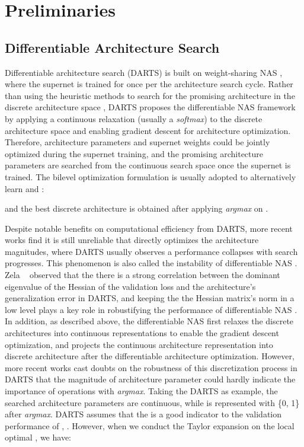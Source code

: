 \documentclass[10pt,twocolumn,letterpaper]{article}
\begin{document}
\section{Preliminaries}
\label{sec2}
\subsection{Differentiable Architecture Search}
\label{sec2.1}

Differentiable architecture search (DARTS) is built on weight-sharing NAS \cite{bender2018understanding,pham2018efficient}, where the supernet is trained for once per the architecture search cycle. Rather than using the heuristic methods \cite{pham2018efficient,zhang2020one} to search for the promising architecture in the discrete architecture space , DARTS \cite{liu2018darts} proposes the differentiable NAS framework by applying a continuous relaxation (usually a \textit{softmax}) to the discrete architecture space and enabling gradient descent for architecture optimization. Therefore, architecture parameters  and supernet weights  could be jointly optimized during the supernet training, and the promising architecture parameters  are searched from the continuous search space  once the supernet is trained. The bilevel optimization formulation is usually adopted to alternatively learn  and :

and the best discrete architecture  is obtained after applying \textit{argmax} on . 

Despite notable benefits on computational efficiency from DARTS, more recent works find it is still unreliable \cite{zela2019understanding,chen2020stabilizing} that directly optimizes the architecture magnitudes, where DARTS usually observes a performance collapses with search progresses. This phenomenon is also called the instability of differentiable NAS  \cite{chen2020stabilizing}. Zela \etal~\cite{zela2019understanding} observed that the there is a strong correlation between the dominant eigenvalue of the Hessian of the validation loss and the architecture’s generalization error in DARTS, and keeping the the Hessian matrix's norm in a low level plays a key role in robustifying the performance of differentiable NAS \cite{chen2020stabilizing}. In addition, as described above, the differentiable NAS first relaxes the discrete architectures into continuous representations to enable the gradient descent optimization, and projects the continuous architecture representation  into discrete architecture  after the differentiable architecture optimization. However, more recent works \cite{Rethinking2021} cast doubts on the robustness of this discretization process in DARTS that the magnitude of architecture parameter  could hardly indicate the importance of operations with \textit{argmax}. Taking the DARTS as example, the searched architecture parameters  are continuous, while  is represented with \{0, 1\} after \textit{argmax}. DARTS assumes that the  is a good indicator to the validation performance of , . However, when we conduct the Taylor expansion on the local optimal  \cite{chen2020stabilizing,chen2020drnas}, we have:
\end{document}
